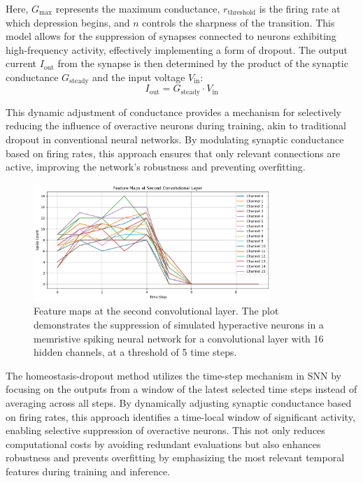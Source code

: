 \noindent Here, \( G_{\text{max}} \) represents the maximum conductance, \( r_{\text{threshold}} \) is the firing rate at which depression begins, and \( n \) controls the sharpness of the transition. This model allows for the suppression of synapses connected to neurons exhibiting high-frequency activity, effectively implementing a form of dropout. The output current \( I_{\text{out}} \) from the synapse is then determined by the product of the synaptic conductance \( G_{\text{steady}} \) and the input voltage \( V_{\text{in}} \):
\begin{equation}
I_{\text{out}} = G_{\text{steady}} \cdot V_{\text{in}} \label{eq:7.2}
\end{equation}

\noindent This dynamic adjustment of conductance provides a mechanism for selectively reducing the influence of overactive neurons during training, akin to traditional dropout in conventional neural networks. By modulating synaptic conductance based on firing rates, this approach ensures that only relevant connections are active, improving the network's robustness and preventing overfitting. \\

\begin{figure}[!t]
    \centerline{\includegraphics[width=0.8\textwidth]{Chapter7/Figs/b.png}}
    \caption[Feature maps at the second convolutional layer.]{Feature maps at the second convolutional layer. The plot demonstrates the suppression of simulated hyperactive neurons in a memristive spiking neural network for a convolutional layer with 16 hidden channels, at a threshold of 5 time steps.}
    \label{fig:7b}
\end{figure}

\noindent The homeostasis-dropout method utilizes the time-step mechanism in SNN by focusing on the outputs from a window of the latest selected time steps instead of averaging across all steps. By dynamically adjusting synaptic conductance based on firing rates, this approach identifies a time-local window of significant activity, enabling selective suppression of overactive neurons. This not only reduces computational costs by avoiding redundant evaluations but also enhances robustness and prevents overfitting by emphasizing the most relevant temporal features during training and inference.

